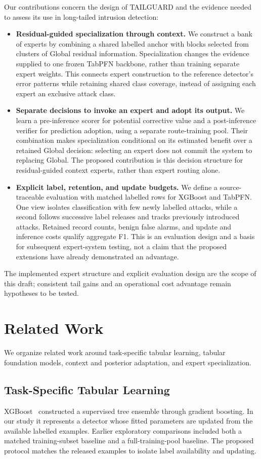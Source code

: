 \documentclass[sigconf,anonymous,pbalance]{acmart}
\begin{document}
Our contributions concern the design of TAILGUARD and the evidence needed to assess its use in long-tailed intrusion detection:
\begin{itemize}
\item \textbf{Residual-guided specialization through context.}
We construct a bank of experts by combining a shared labelled anchor with blocks selected from clusters of Global residual information. Specialization changes the evidence supplied to one frozen TabPFN backbone, rather than training separate expert weights. This connects expert construction to the reference detector's error patterns while retaining shared class coverage, instead of assigning each expert an exclusive attack class.
\item \textbf{Separate decisions to invoke an expert and adopt its output.}
We learn a pre-inference scorer for potential corrective value and a post-inference verifier for prediction adoption, using a separate route-training pool. Their combination makes specialization conditional on its estimated benefit over a retained Global decision: selecting an expert does not commit the system to replacing Global. The proposed contribution is this decision structure for residual-guided context experts, rather than expert routing alone.
\item \textbf{Explicit label, retention, and update budgets.}
We define a source-traceable evaluation with matched labelled rows for XGBoost and TabPFN. One view isolates classification with few newly labelled attacks, while a second follows successive label releases and tracks previously introduced attacks. Retained record counts, benign false alarms, and update and inference costs qualify aggregate F1. This is an evaluation design and a basis for subsequent expert-system testing, not a claim that the proposed extensions have already demonstrated an advantage.
\end{itemize}
The implemented expert structure and explicit evaluation design are the scope of this draft; consistent tail gains and an operational cost advantage remain hypotheses to be tested.

\section{Related Work}
\label{sec:related}
We organize related work around task-specific tabular learning, tabular foundation models, context and posterior adaptation, and expert specialization.

\subsection{Task-Specific Tabular Learning}
XGBoost~\cite{chen2016xgboost} constructed a supervised tree ensemble through gradient boosting. In our study it represents a detector whose fitted parameters are updated from the available labelled examples. Earlier exploratory comparisons included both a matched training-subset baseline and a full-training-pool baseline. The proposed protocol matches the released examples to isolate label availability and updating.
\end{document}
